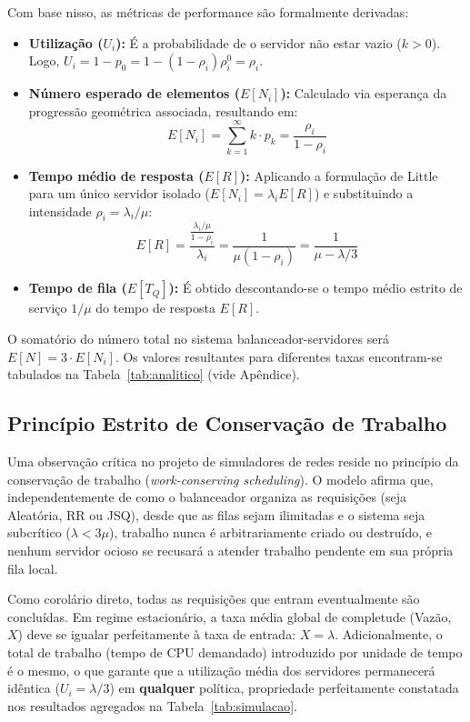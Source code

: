 \documentclass[conference]{IEEEtran}
\begin{document}
Com base nisso, as métricas de performance são formalmente derivadas:
\begin{itemize}
    \item \textbf{Utilização ($U_i$):} É a probabilidade de o servidor não estar vazio ($k > 0$). Logo, $U_i = 1 - p_0 = 1 - (1-\rho_i)\rho_i^0 = \rho_i$.
    \item \textbf{Número esperado de elementos ($E[N_i]$):} Calculado via esperança da progressão geométrica associada, resultando em:
    \begin{equation}
    E[N_i] = \sum_{k=1}^{\infty} k \cdot p_k = \frac{\rho_i}{1-\rho_i}
    \end{equation}
    \item \textbf{Tempo médio de resposta ($E[R]$):} Aplicando a formulação de Little para um único servidor isolado ($E[N_i] = \lambda_i E[R]$) e substituindo a intensidade $\rho_i = \lambda_i / \mu$:
    \begin{equation}
    E[R] = \frac{\frac{\lambda_i/\mu}{1-\rho_i}}{\lambda_i} = \frac{1}{\mu(1-\rho_i)} = \frac{1}{\mu - \lambda/3}
    \end{equation}
    \item \textbf{Tempo de fila ($E[T_Q]$):} É obtido descontando-se o tempo médio estrito de serviço $1/\mu$ do tempo de resposta $E[R]$.
\end{itemize}

O somatório do número total no sistema balanceador-servidores será $E[N] = 3 \cdot E[N_i]$. Os valores resultantes para diferentes taxas encontram-se tabulados na Tabela~\ref{tab:analitico} (vide Apêndice).

\subsection{Princípio Estrito de Conservação de Trabalho}

Uma observação crítica no projeto de simuladores de redes reside no princípio da conservação de trabalho (\textit{work-conserving scheduling}). O modelo afirma que, independentemente de como o balanceador organiza as requisições (seja Aleatória, RR ou JSQ), desde que as filas sejam ilimitadas e o sistema seja subcrítico ($\lambda < 3\mu$), trabalho nunca é arbitrariamente criado ou destruído, e nenhum servidor ocioso se recusará a atender trabalho pendente em sua própria fila local.

Como corolário direto, todas as requisições que entram eventualmente são concluídas. Em regime estacionário, a taxa média global de completude (Vazão, $X$) deve se igualar perfeitamente à taxa de entrada: $X = \lambda$. Adicionalmente, o total de trabalho (tempo de CPU demandado) introduzido por unidade de tempo é o mesmo, o que garante que a utilização média dos servidores permanecerá idêntica ($U_i = \lambda/3$) em \textbf{qualquer} política, propriedade perfeitamente constatada nos resultados agregados na Tabela~\ref{tab:simulacao}.
\end{document}
